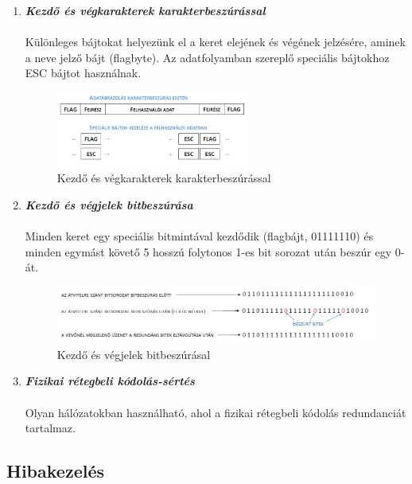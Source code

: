 \documentclass[12pt]{article}
\begin{document}
\begin{enumerate}
            \item \emph{\textbf{Kezdő és végkarakterek karakterbeszúrással}} \\\\
            Különleges bájtokat helyezünk el a keret elejének és végének jelzésére, aminek a neve jelző bájt (flagbyte). Az adatfolyamban szereplő speciális bájtokhoz ESC bájtot használnak.
            \begin{figure}[H]
                \centering
                \includegraphics[width=0.6\textwidth]{img/karakterbeszuras.png}
                \caption{Kezdő és végkarakterek karakterbeszúrással}	
            \end{figure}
            \item \emph{\textbf{Kezdő és végjelek bitbeszúrása}} \\\\
            Minden keret egy speciális bitmintával kezdődik (flagbájt, 01111110) és minden egymást követő 5 hosszú folytonos 1-es bit sorozat után beszúr egy 0-át.
            \begin{figure}[H]
                \centering
                \includegraphics[width=1.0\textwidth]{img/bitbeszuras.png}
                \caption{Kezdő és végjelek bitbeszúrásal}	
            \end{figure}
            \item \emph{\textbf{Fizikai rétegbeli kódolás-sértés}} \\\\
            Olyan hálózatokban használható, ahol a fizikai rétegbeli kódolás redundanciát tartalmaz.
        \end{enumerate}

    \subsection*{Hibakezelés}
\end{document}
